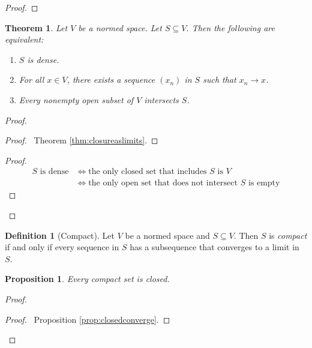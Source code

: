\documentclass{book}
\let\qed\relax
\newtheorem{prop}[ax]{Proposition}
\newtheorem{thm}[ax]{Theorem}
\theoremstyle{definition}
\newtheorem{df}[ax]{Definition}
\begin{document}
\begin{proof}
\pf
{}
\qed
\end{proof}

\begin{thm}
Let $V$ be a normed space. Let $S \subseteq V$. Then the following are equivalent:
\begin{enumerate}
\item $S$ is dense.
\item For all $x \in V$, there exists a sequence $(x_n)$ in $S$ such that $x_n \rightarrow x$.
\item Every nonempty open subset of $V$ intersects $S$.
\end{enumerate}
\end{thm}

\begin{proof}
\pf
{}
\begin{proof}
	\pf\ Theorem \ref{thm:closureaslimits}.
\end{proof}
\begin{proof}
	\pf
	\begin{align*}
	S \text{ is dense} & \Leftrightarrow \text{the only closed set that includes $S$ is $V$} \\
	& \Leftrightarrow \text{the only open set that does not intersect $S$ is empty}
	\end{align*}
\end{proof}
\qed
\end{proof}

\begin{df}[Compact]
Let $V$ be a normed space and $S \subseteq V$. Then $S$ is \emph{compact} if and only if every sequence in $S$ has a subsequence that converges to a limit in $S$.
\end{df}

\begin{prop}
\label{prop:compactclosed}
Every compact set is closed.
\end{prop}

\begin{proof}
\pf
{}
\qedstep
\begin{proof}
	\pf\ Proposition \ref{prop:closedconverge}.
\end{proof}
\qed
\end{proof}
\end{document}

